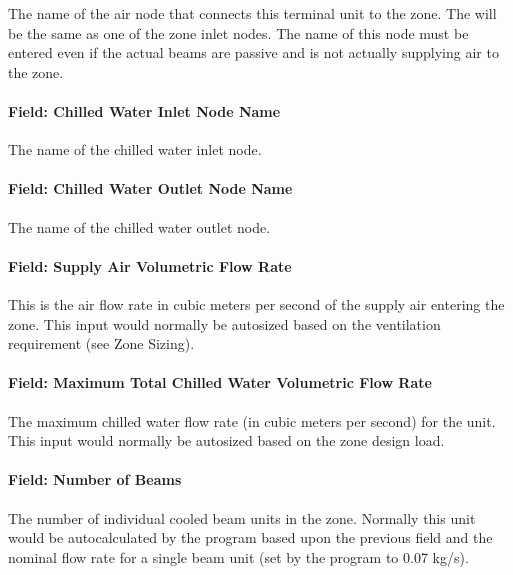 The name of the air node that connects this terminal unit to the zone. The will be the same as one of the zone inlet nodes. The name of this node must be entered even if the actual beams are passive and is not actually supplying air to the zone.

\paragraph{Field: Chilled Water Inlet Node Name}\label{field-chilled-water-inlet-node-name-1}

The name of the chilled water inlet node.

\paragraph{Field: Chilled Water Outlet Node Name}\label{field-chilled-water-outlet-node-name-1}

The name of the chilled water outlet node.

\paragraph{Field: Supply Air Volumetric Flow Rate}\label{field-supply-air-volumetric-flow-rate}

This is the air flow rate in cubic meters per second of the supply air entering the zone. This input would normally be autosized based on the ventilation requirement (see Zone Sizing).

\paragraph{Field: Maximum Total Chilled Water Volumetric Flow Rate}\label{field-maximum-total-chilled-water-volumetric-flow-rate}

The maximum chilled water flow rate (in cubic meters per second) for the unit. This input would normally be autosized based on the zone design load.

\paragraph{Field: Number of Beams}\label{field-number-of-beams}

The number of individual cooled beam units in the zone. Normally this unit would be autocalculated by the program based upon the previous field and the nominal flow rate for a single beam unit (set by the program to 0.07 kg/s).


